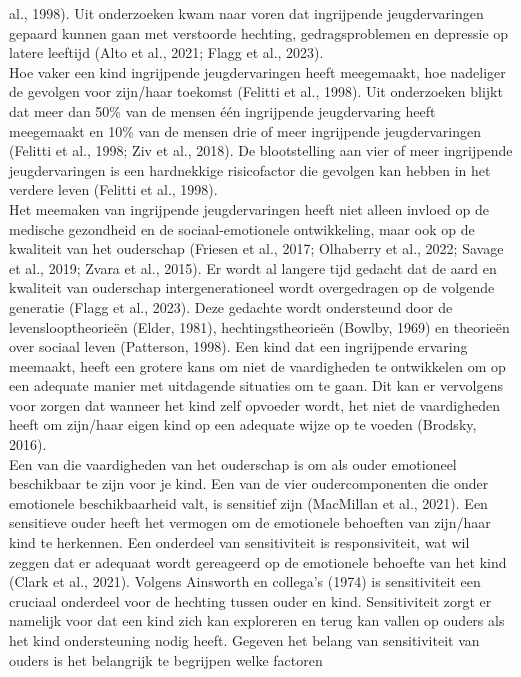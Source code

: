 \documentclass[12pt]{article}
\begin{document}
al., 1998). Uit onderzoeken kwam naar voren dat ingrijpende
jeugdervaringen gepaard kunnen gaan met verstoorde hechting,
gedragsproblemen en depressie op latere leeftijd (Alto et al., 2021;
Flagg et al., 2023).\\
Hoe vaker een kind ingrijpende jeugdervaringen heeft meegemaakt, hoe
nadeliger de gevolgen voor zijn/haar toekomst (Felitti et al., 1998).
Uit onderzoeken blijkt dat meer dan 50\% van de mensen één ingrijpende
jeugdervaring heeft meegemaakt en 10\% van de mensen drie of meer
ingrijpende jeugdervaringen (Felitti et al., 1998; Ziv et al., 2018). De
blootstelling aan vier of meer ingrijpende jeugdervaringen is een
hardnekkige risicofactor die gevolgen kan hebben in het verdere leven
(Felitti et al., 1998).\\
Het meemaken van ingrijpende jeugdervaringen heeft niet alleen invloed
op de medische gezondheid en de sociaal-emotionele ontwikkeling, maar
ook op de kwaliteit van het ouderschap (Friesen et al., 2017; Olhaberry
et al., 2022; Savage et al., 2019; Zvara et al., 2015). Er wordt al
langere tijd gedacht dat de aard en kwaliteit van ouderschap
intergenerationeel wordt overgedragen op de volgende generatie (Flagg et
al., 2023). Deze gedachte wordt ondersteund door de levenslooptheorieën
(Elder, 1981), hechtingstheorieën (Bowlby, 1969) en theorieën over
sociaal leven (Patterson, 1998). Een kind dat een ingrijpende ervaring
meemaakt, heeft een grotere kans om niet de vaardigheden te ontwikkelen
om op een adequate manier met uitdagende situaties om te gaan. Dit kan
er vervolgens voor zorgen dat wanneer het kind zelf opvoeder wordt, het
niet de vaardigheden heeft om zijn/haar eigen kind op een adequate wijze
op te voeden (Brodsky, 2016).\\
Een van die vaardigheden van het ouderschap is om als ouder emotioneel
beschikbaar te zijn voor je kind. Een van de vier oudercomponenten die
onder emotionele beschikbaarheid valt, is sensitief zijn (MacMillan et
al., 2021). Een sensitieve ouder heeft het vermogen om de emotionele
behoeften van zijn/haar kind te herkennen. Een onderdeel van
sensitiviteit is responsiviteit, wat wil zeggen dat er adequaat wordt
gereageerd op de emotionele behoefte van het kind (Clark et al., 2021).
Volgens Ainsworth en collega's (1974) is sensitiviteit een cruciaal
onderdeel voor de hechting tussen ouder en kind. Sensitiviteit zorgt er
namelijk voor dat een kind zich kan exploreren en terug kan vallen op
ouders als het kind ondersteuning nodig heeft. Gegeven het belang van
sensitiviteit van ouders is het belangrijk te begrijpen welke factoren
\end{document}
